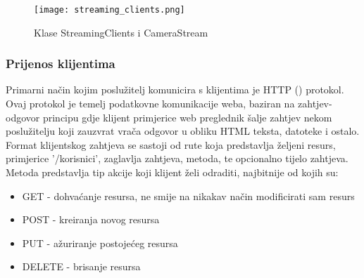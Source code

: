\begin{figure}
  \texttt{[image: streaming\_clients.png]}
  \caption{Klase StreamingClients i CameraStream}
\end{figure}
\clearpage
\subsubsection{Prijenos klijentima}
Primarni način kojim poslužitelj komunicira s klijentima je HTTP () protokol.
\paraBreak
Ovaj protokol je temelj podatkovne komunikacije weba, baziran na zahtjev-odgovor principu gdje klijent primjerice
web preglednik šalje zahtjev nekom poslužitelju koji zauzvrat vrača odgovor u obliku HTML teksta, datoteke i ostalo.
\paraBreak
Format klijentskog zahtjeva se sastoji od rute koja predstavlja željeni resurs, primjerice '/korisnici', zaglavlja
zahtjeva, metoda, te opcionalno tijelo zahtjeva.
Metoda predstavlja tip akcije koji klijent želi odraditi, najbitnije od kojih su:
\begin{itemize}
  \item GET - dohvaćanje resursa, ne smije na nikakav način modificirati sam resurs
  \item POST - kreiranja novog resursa
  \item PUT - ažuriranje postojećeg resursa
  \item DELETE - brisanje resursa
\end{itemize}

